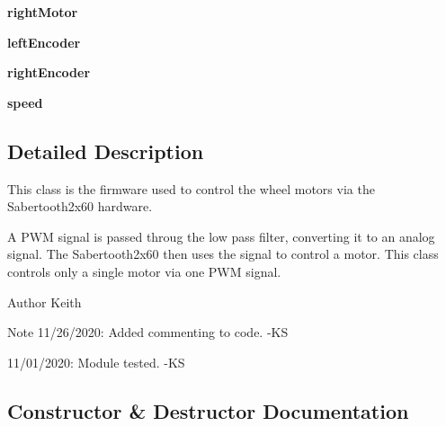 \begin{DoxyCompactItemize}
\item 
\mbox{\label{classDriveControl_1_1DriveControl_ad0e00026cd9aa2a22e3d86e59efe6bd7}} 
{\bfseries right\+Motor}
\item 
\mbox{\label{classDriveControl_1_1DriveControl_a80dfa7aac1d722336dd6ce604611ed02}} 
{\bfseries left\+Encoder}
\item 
\mbox{\label{classDriveControl_1_1DriveControl_ae3fed7223d30109f8af90c227010a2c3}} 
{\bfseries right\+Encoder}
\item 
\mbox{\label{classDriveControl_1_1DriveControl_ab5c02115bf232ca22fa9082616e88d36}} 
{\bfseries speed}
\end{DoxyCompactItemize}


\subsection{Detailed Description}
This class is the firmware used to control the wheel motors via the Sabertooth2x60 hardware. 

A P\+WM signal is passed throug the low pass filter, converting it to an analog signal. The Sabertooth2x60 then uses the signal to control a motor. This class controls only a single motor via one P\+WM signal. \begin{DoxyAuthor}{Author}
Keith 
\end{DoxyAuthor}
\begin{DoxyNote}{Note}
11/26/2020\+: Added commenting to code. -\/\+KS 

11/01/2020\+: Module tested. -\/\+KS 
\end{DoxyNote}


\subsection{Constructor \& Destructor Documentation}
\mbox{\label{classDriveControl_1_1DriveControl_abcdb8160a3b27ddcf93d075dfa354eab}} 
